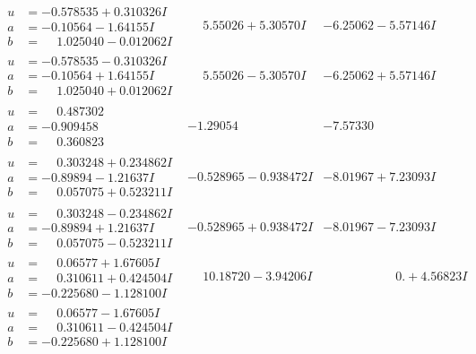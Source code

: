 \documentclass[1p]{elsarticle_modified}
\theoremstyle{definition}
\begin{document}
$$\begin{array}{c|c|c}
\begin{aligned}
u &= -0.578535 + 0.310326 I \\
a &= -0.10564 - 1.64155 I \\
b &= \phantom{-}1.025040 - 0.012062 I\end{aligned}
 & \phantom{-}5.55026 + 5.30570 I & -6.25062 - 5.57146 I \\ \hline\begin{aligned}
u &= -0.578535 - 0.310326 I \\
a &= -0.10564 + 1.64155 I \\
b &= \phantom{-}1.025040 + 0.012062 I\end{aligned}
 & \phantom{-}5.55026 - 5.30570 I & -6.25062 + 5.57146 I \\ \hline\begin{aligned}
u &= \phantom{-}0.487302\phantom{ +0.000000I} \\
a &= -0.909458\phantom{ +0.000000I} \\
b &= \phantom{-}0.360823\phantom{ +0.000000I}\end{aligned}
 & -1.29054\phantom{ +0.000000I} & -7.57330\phantom{ +0.000000I} \\ \hline\begin{aligned}
u &= \phantom{-}0.303248 + 0.234862 I \\
a &= -0.89894 - 1.21637 I \\
b &= \phantom{-}0.057075 + 0.523211 I\end{aligned}
 & -0.528965 - 0.938472 I & -8.01967 + 7.23093 I \\ \hline\begin{aligned}
u &= \phantom{-}0.303248 - 0.234862 I \\
a &= -0.89894 + 1.21637 I \\
b &= \phantom{-}0.057075 - 0.523211 I\end{aligned}
 & -0.528965 + 0.938472 I & -8.01967 - 7.23093 I \\ \hline\begin{aligned}
u &= \phantom{-}0.06577 + 1.67605 I \\
a &= \phantom{-}0.310611 + 0.424504 I \\
b &= -0.225680 - 1.128100 I\end{aligned}
 & \phantom{-}10.18720 - 3.94206 I & \phantom{-0.000000 -}0. + 4.56823 I \\ \hline\begin{aligned}
u &= \phantom{-}0.06577 - 1.67605 I \\
a &= \phantom{-}0.310611 - 0.424504 I \\
b &= -0.225680 + 1.128100 I\end{aligned}

\end{array}$$
\end{document}
